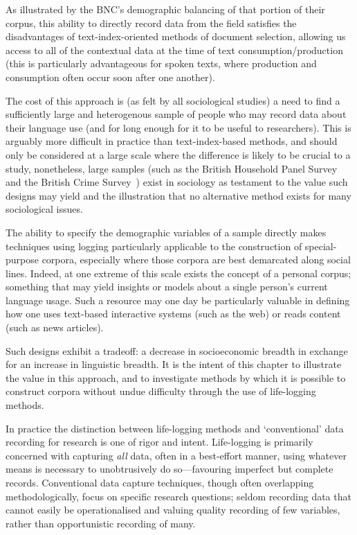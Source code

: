 As illustrated by the BNC's demographic balancing of that portion of their corpus, this ability to directly record data from the field satisfies the disadvantages of text-index-oriented methods of document selection, allowing us access to all of the contextual data at the time of text consumption/production (this is particularly advantageous for spoken texts, where production and consumption often occur soon after one another).

The cost of this approach is (as felt by all sociological studies) a need to find a sufficiently large and heterogenous sample of people who may record data about their language use (and for long enough for it to be useful to researchers).  This is arguably more difficult in practice than text-index-based methods, and should only be considered at a large scale where the difference is likely to be crucial to a study, nonetheless, large samples (such as the British Household Panel Survey and the British Crime Survey~) exist in sociology as testament to the value such designs may yield and the illustration that no alternative method exists for many sociological issues.

The ability to specify the demographic variables of a sample directly makes techniques using logging particularly applicable to the construction of special-purpose corpora, especially where those corpora are best demarcated along social lines.  Indeed, at one extreme of this scale exists the concept of a personal corpus; something that may yield insights or models about a single person's current language usage.  Such a resource may one day be particularly valuable in defining how one uses text-based interactive systems (such as the web) or reads content (such as news articles).

Such designs exhibit a tradeoff: a decrease in socioeconomic breadth in exchange for an increase in linguistic breadth.  It is the intent of this chapter to illustrate the value in this approach, and to investigate methods by which it is possible to construct corpora without undue difficulty through the use of life-logging methods.




In practice the distinction between life-logging methods and `conventional' data recording for research is one of rigor and intent.  Life-logging is primarily concerned with capturing \textsl{all} data, often in a best-effort manner, using whatever means is necessary to unobtrusively do so---favouring imperfect but complete records.  Conventional data capture techniques, though often overlapping methodologically, focus on specific research questions; seldom recording data that cannot easily be operationalised and valuing quality recording of few variables, rather than opportunistic recording of many.



